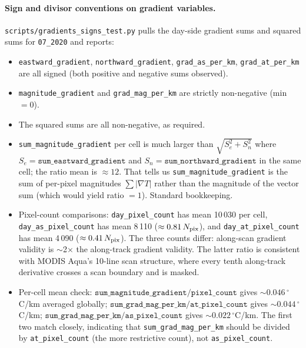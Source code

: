 \documentclass[11pt]{article}
\begin{document}
\paragraph{Sign and divisor conventions on gradient variables.}
\texttt{scripts/gradients\_signs\_test.py} pulls the day-side
gradient sums and squared sums for \texttt{07\_2020} and reports:
\begin{itemize}
  \item \texttt{eastward\_gradient}, \texttt{northward\_gradient},
    \texttt{grad\_as\_per\_km}, \texttt{grad\_at\_per\_km} are
    all signed (both positive and negative sums observed).
  \item \texttt{magnitude\_gradient} and \texttt{grad\_mag\_per\_km}
    are strictly non-negative (min $= 0$).
  \item The squared sums are all non-negative, as required.
  \item \texttt{sum\_magnitude\_gradient} per cell is much larger
    than $\sqrt{S_e^2 + S_n^2}$ where $S_e =
    \mathtt{sum\_eastward\_gradient}$ and $S_n =
    \mathtt{sum\_northward\_gradient}$ in the same cell; the ratio
    mean is $\approx 12$. That tells us
    \texttt{sum\_magnitude\_gradient} is the sum of per-pixel
    magnitudes $\sum |\nabla T|$ rather than the magnitude of the
    vector sum (which would yield ratio $= 1$). Standard
    bookkeeping.
  \item Pixel-count comparisons: \texttt{day\_pixel\_count} has
    mean 10\,030 per cell, \texttt{day\_as\_pixel\_count} has
    mean 8\,110 ($\approx 0.81\,N_{\rm pix}$), and
    \texttt{day\_at\_pixel\_count} has mean 4\,090
    ($\approx 0.41\,N_{\rm pix}$). The three counts differ:
    along-scan gradient validity is $\sim$2$\times$ the along-track
    gradient validity. The latter ratio is consistent with MODIS
    Aqua's 10-line scan structure, where every tenth along-track
    derivative crosses a scan boundary and is masked.
  \item Per-cell mean check: $\mathtt{sum\_magnitude\_gradient}
    / \mathtt{pixel\_count}$ gives $\sim 0.046\,^\circ$C/km
    averaged globally; $\mathtt{sum\_grad\_mag\_per\_km}
    / \mathtt{at\_pixel\_count}$ gives $\sim 0.044\,^\circ$C/km;
    $\mathtt{sum\_grad\_mag\_per\_km} / \mathtt{as\_pixel\_count}$
    gives $\sim 0.022\,^\circ$C/km. The first two match closely,
    indicating that \texttt{sum\_grad\_mag\_per\_km} should be
    divided by \texttt{at\_pixel\_count} (the more restrictive
    count), not \texttt{as\_pixel\_count}.
\end{itemize}
\end{document}
